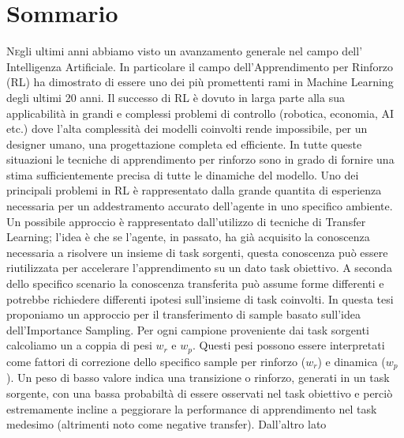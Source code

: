 
\cleardoublepage
{}

\begingroup
\let\cleardoublepage\relax
\let\cleardoublepage\relax

%
%
\chapter*{Sommario}

\lettrine[lines=2]{N}egli ultimi anni abbiamo visto un avanzamento generale nel campo dell' Intelligenza Artificiale.
In particolare il campo dell'Apprendimento per Rinforzo (RL) ha dimostrato di essere uno dei più promettenti
rami in Machine Learning degli ultimi 20 anni.\newline
Il successo di RL è dovuto in larga parte alla sua applicabilità in grandi e complessi problemi
di controllo (robotica, economia, AI etc.) dove l'alta complessità dei modelli coinvolti rende
impossibile, per un designer umano, una progettazione completa ed efficiente. In tutte queste
situazioni le tecniche di apprendimento per rinforzo  sono in grado di fornire una stima sufficientemente
precisa di tutte le dinamiche del modello.\newline
Uno dei principali problemi in RL è rappresentato dalla grande quantita di esperienza necessaria per un
addestramento accurato dell'agente in uno specifico ambiente.
Un possibile approccio è rappresentato dall'utilizzo di tecniche di Transfer Learning; l'idea è che se
l'agente, in passato, ha già acquisito la conoscenza necessaria a risolvere un insieme di task sorgenti,
questa conoscenza può essere riutilizzata per accelerare l'apprendimento su un dato task obiettivo.
A seconda dello specifico scenario la conoscenza transferita può assume forme differenti e potrebbe
richiedere differenti ipotesi sull'insieme di task coinvolti.\newline
In questa tesi proponiamo un approccio per il transferimento di sample basato sull'idea dell'Importance
Sampling. Per ogni campione proveniente dai task sorgenti calcoliamo un a coppia di pesi $w_r$ e $w_p$.
Questi pesi possono essere interpretati come fattori di correzione dello specifico sample per rinforzo ($w_r$)
e dinamica ($w_p$). Un peso di basso valore indica una transizione o rinforzo, generati in un task sorgente,
con una bassa probabiltà di essere osservati nel task obiettivo e perciò estremamente incline a peggiorare
la performance di apprendimento nel task medesimo (altrimenti noto come negative transfer). Dall'altro lato
